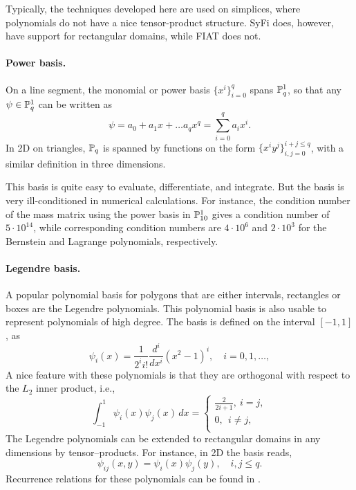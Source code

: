 Typically, the techniques developed here are used on simplices, where
polynomials do not have a nice tensor-product structure.  SyFi does,
however, have support for rectangular domains, while FIAT does not.

\paragraph{Power basis.}
On a line segment, the monomial or power basis $\{ x^i \}_{i=0}^{q}$
spans $\P^1_q$, so that any $\psi \in \P^1_q$ can be written as
\begin{equation}
\label{pn1d}
\psi = a_0 + a_1 x + \ldots a_q x^q = \sum^q_{i=0} a_i x^i.
\end{equation}
In 2D on triangles, $\P_q$ is spanned by functions on the form $\{
x^i y^j \}_{i,j=0}^{i+j\leq q}$, with a similar definition in three
dimensions.

This basis is quite easy to evaluate, differentiate, and integrate. But
the basis is very ill-conditioned in numerical calculations.
For instance, the condition number of the mass matrix using the power
basis in $\P^1_{10}$ gives a condition number of $5\cdot10^{14}$, while
corresponding condition numbers are $4\cdot 10^6$ and $2\cdot 10^3$
for the Bernstein and Lagrange polynomials, respectively.

\paragraph{Legendre basis.}

A popular polynomial basis for polygons that are either intervals,
rectangles or boxes are the Legendre polynomials.  This polynomial basis
is also usable to represent polynomials of high degree.  The basis is
defined on the interval $[-1,1]$, as
\begin{equation}
\psi_i(x) = \frac{1}{2^i i!} \frac{d^i}{dx^i} (x^2 -1)^i, \quad i=0,1,\ldots,
\end{equation}
A nice feature with these polynomials is that they are orthogonal with
respect to the $L_2$ inner product, i.e.,
\begin{equation}
\int_{-1}^1 \psi_i (x) \psi_j(x) \, dx  =
\left\{
\begin{array}{c}
\frac{2}{2i+1}, \ i=j, \\
0 , \ \ i\not= j, \\
\end{array}
\right.
\end{equation}
The Legendre polynomials can be extended to rectangular domains in any
dimensions by tensor--products.  For instance, in 2D the basis reads,
\begin{equation}
\psi_{ij}(x,y) = \psi_i(x) \psi_j(y) ,   \quad i,j \leq q.
\end{equation}
Recurrence relations for these polynomials can be found in
\citet{KarniadakisSherwin2005}.

